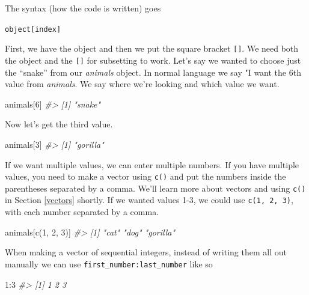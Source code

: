 \documentclass[
]{krantz}
\makeatletter
\newenvironment{Shaded}{\begin{snugshade}}{\end{snugshade}}
\newcommand{\CommentTok}[1]{\textcolor[rgb]{0.37,0.37,0.37}{\textit{#1}}}
\newcommand{\DecValTok}[1]{\textcolor[rgb]{0.06,0.06,0.06}{#1}}
\newcommand{\FunctionTok}[1]{\textcolor[rgb]{0,0,0}{#1}}
\newcommand{\NormalTok}[1]{#1}
\newcommand{\SpecialCharTok}[1]{\textcolor[rgb]{0,0,0}{#1}}
\newenvironment{kframe}{%
\medskip{}
\setlength{\fboxsep}{.8em}
 \def\at@end@of@kframe{}%
 \ifinner\ifhmode%
  \def\at@end@of@kframe{\end{minipage}}%
  \begin{minipage}{\columnwidth}%
 \fi\fi%
 \def\FrameCommand##1{\hskip\@totalleftmargin \hskip-\fboxsep
 \colorbox{shadecolor}{##1}\hskip-\fboxsep
     \hskip-\linewidth \hskip-\@totalleftmargin \hskip\columnwidth}%
 \MakeFramed {\advance\hsize-\width
   \@totalleftmargin\z@ \linewidth\hsize
   \@setminipage}}%
 {\par\unskip\endMakeFramed%
 \at@end@of@kframe}
\renewenvironment{Shaded}{\begin{kframe}}{\end{kframe}}
\makeatother
\begin{document}
The syntax (how the code is written) goes

\texttt{object{[}index{]}}

First, we have the object and then we put the square bracket \texttt{{[}{]}}. We need both the object and the \texttt{{[}{]}} for subsetting to work. Let's say we wanted to choose just the ``snake'' from our \emph{animals} object. In normal language we say "I want the 6th value from \emph{animals}. We say where we're looking and which value we want.

\begin{Shaded}
\begin{Highlighting}[]
\NormalTok{animals[}\DecValTok{6}\NormalTok{]}
\CommentTok{\#\textgreater{} [1] "snake"}
\end{Highlighting}
\end{Shaded}

Now let's get the third value.

\begin{Shaded}
\begin{Highlighting}[]
\NormalTok{animals[}\DecValTok{3}\NormalTok{]}
\CommentTok{\#\textgreater{} [1] "gorilla"}
\end{Highlighting}
\end{Shaded}

If we want multiple values, we can enter multiple numbers. If you have multiple values, you need to make a vector using \texttt{c()} and put the numbers inside the parentheses separated by a comma. We'll learn more about vectors and using \texttt{c()} in Section \ref{vectors} shortly. If we wanted values 1-3, we could use \texttt{c(1,\ 2,\ 3)}, with each number separated by a comma.

\begin{Shaded}
\begin{Highlighting}[]
\NormalTok{animals[}\FunctionTok{c}\NormalTok{(}\DecValTok{1}\NormalTok{, }\DecValTok{2}\NormalTok{, }\DecValTok{3}\NormalTok{)]}
\CommentTok{\#\textgreater{} [1] "cat"     "dog"     "gorilla"}
\end{Highlighting}
\end{Shaded}

When making a vector of sequential integers, instead of writing them all out manually we can use \texttt{first\_number:last\_number} like so

\begin{Shaded}
\begin{Highlighting}[]
\DecValTok{1}\SpecialCharTok{:}\DecValTok{3}
\CommentTok{\#\textgreater{} [1] 1 2 3}
\end{Highlighting}
\end{Shaded}
\end{document}
